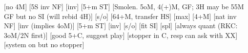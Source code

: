\begin{bidsemi}
[no 4M]
    [5S inv NF]
    [inv]
    [5+m ST]
    [Smolen. 5oM, 4(+)M, GF; 3H may be 55M GF but no SI (will rebid 4H)]
    [s/o]
    [64+M, transfer HS]
        [max]
[4+M]
    [nat inv NF]
    [inv (implies 4oM)]
    [5+m ST]
    [inv]
    [s/o]
    [fit SI]
    [spl]
    [always quant (RKC: 3oM/2N first)]
    [good 5+C, suggest play]
    [stopper in C, resp can ask with XX]
    [system on but no stopper]
\end{bidsemi}